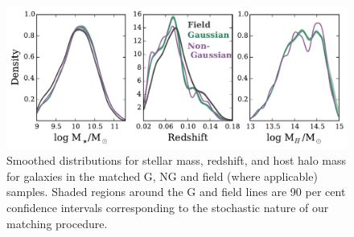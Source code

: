 \documentclass[a4paper,fleqn,usenatbib]{mnras}
\begin{document}
\begin{figure}
  \centering
  \includegraphics[width=\textwidth]{dist_m2_s.pdf}
  \caption{Smoothed distributions for stellar mass, redshift, and host
    halo mass for galaxies in the matched G, NG and field (where
    applicable) samples.  Shaded regions around the G and field lines
    are 90 per cent confidence intervals corresponding to the
    stochastic nature of our matching procedure.}
  \label{fig:dist_m2_s}
\end{figure}
\end{document}
